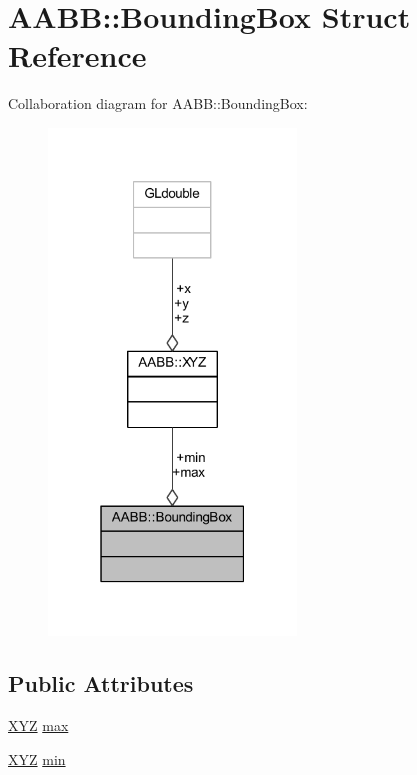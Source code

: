 \hypertarget{struct_a_a_b_b_1_1_bounding_box}{}\section{A\+A\+BB\+:\+:Bounding\+Box Struct Reference}
\label{struct_a_a_b_b_1_1_bounding_box}


Collaboration diagram for A\+A\+BB\+:\+:Bounding\+Box\+:
\nopagebreak
\begin{figure}[H]
\begin{center}
\leavevmode
\includegraphics[width=187pt]{struct_a_a_b_b_1_1_bounding_box__coll__graph}
\end{center}
\end{figure}
\subsection*{Public Attributes}
\begin{DoxyCompactItemize}
\item 
\hyperlink{struct_a_a_b_b_1_1_x_y_z}{X\+YZ} \hyperlink{struct_a_a_b_b_1_1_bounding_box_a3eab345c474818852c6fc60fa78b9dd4}{max}
\item 
\hyperlink{struct_a_a_b_b_1_1_x_y_z}{X\+YZ} \hyperlink{struct_a_a_b_b_1_1_bounding_box_a47ffd944b2b41d2ebd1fee2f6d16a6d4}{min}
\end{DoxyCompactItemize}



